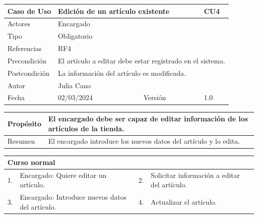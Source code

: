 \begin{table}[H]
	\centering
	\begin{tabular}{| m{} | m{} | m{} | m{} |}
		\hline
		\rowcolor{grayshade} Caso de Uso & \multicolumn{2}{|m{0.43\textwidth}|}{Edición de un artículo existente} &  CU4\\ 
		\hline
		Actores & \multicolumn{3}{l|}{Encargado} \\ 
		\hline
		Tipo & \multicolumn{3}{l|}{Obligatorio} \\ 
		\hline
		Referencias & \multicolumn{3}{l|}{RF4} \\ 
		\hline
		Precondición & \multicolumn{3}{m{0.67\textwidth}|}{El artículo a editar debe estar registrado en el sistema.} \\ 
		\hline
		Postcondición & \multicolumn{3}{l|}{La información del artículo es modificada.} \\ 
		\hline
		Autor & \multicolumn{3}{l|}{Julia Cano} \\ 
		\hline
		Fecha & 02/03/2024 & Versión & 1.0 \\
		\hline
	\end{tabular}
\end{table}

\begin{table}[H]
	\centering
	\begin{tabular}{| m{} | m{} | m{} | m{} |}
		\hline
		Propósito & \multicolumn{3}{m{0.67\textwidth}|}{El encargado debe ser capaz de editar información de los artículos de la tienda.}   \\ 
		\hline
		Resumen & \multicolumn{3}{m{0.67\textwidth}|}{El encargado introduce los nuevos datos del artículo y lo edita.} \\ 
		\hline
	\end{tabular}
\end{table}


\begin{table}[H]
	\centering
	\begin{tabular}{| m{} | m{} | m{} | m{} |}
		\hline
		\multicolumn{4}{|m{0.9\textwidth}|}{Curso normal}     \\ 
		\hline
		1. & Encargado: Quiere editar un artículo. & 2. &  Solicitar información a editar del artículo.  \\ 
		\hline
		3. & Encargado: Introduce nuevos datos del artículo. & 4. & Actualizar el artículo. \\ 
		\hline
	\end{tabular}
\end{table}

